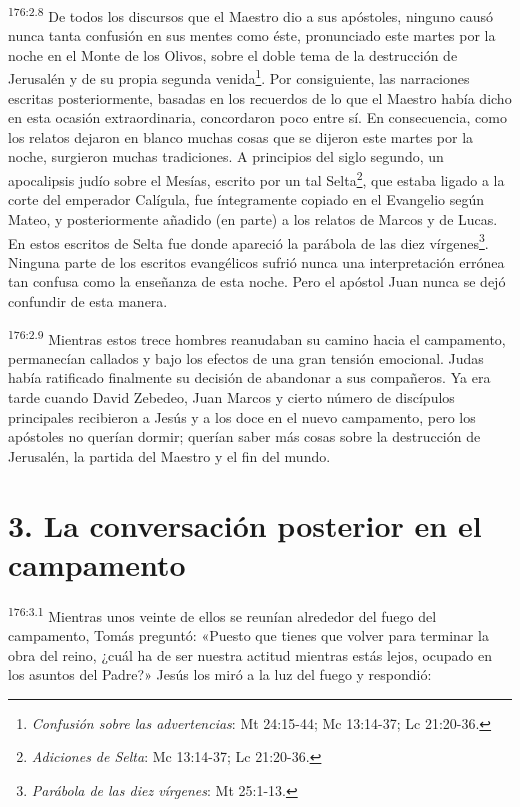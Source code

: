 \par 
\textsuperscript{176:2.8} De todos los discursos que el Maestro dio a sus apóstoles, ninguno causó nunca tanta confusión en sus mentes como éste, pronunciado este martes por la noche en el Monte de los Olivos, sobre el doble tema de la destrucción de Jerusalén y de su propia segunda venida\footnote{\textit{Confusión sobre las advertencias}: Mt 24:15-44; Mc 13:14-37; Lc 21:20-36.}. Por consiguiente, las narraciones escritas posteriormente, basadas en los recuerdos de lo que el Maestro había dicho en esta ocasión extraordinaria, concordaron poco entre sí. En consecuencia, como los relatos dejaron en blanco muchas cosas que se dijeron este martes por la noche, surgieron muchas tradiciones. A principios del siglo segundo, un apocalipsis judío sobre el Mesías, escrito por un tal Selta\footnote{\textit{Adiciones de Selta}: Mc 13:14-37; Lc 21:20-36.}, que estaba ligado a la corte del emperador Calígula, fue íntegramente copiado en el Evangelio según Mateo, y posteriormente añadido (en parte) a los relatos de Marcos y de Lucas. En estos escritos de Selta fue donde apareció la parábola de las diez vírgenes\footnote{\textit{Parábola de las diez vírgenes}: Mt 25:1-13.}. Ninguna parte de los escritos evangélicos sufrió nunca una interpretación errónea tan confusa como la enseñanza de esta noche. Pero el apóstol Juan nunca se dejó confundir de esta manera.

\par 
\textsuperscript{176:2.9} Mientras estos trece hombres reanudaban su camino hacia el campamento, permanecían callados y bajo los efectos de una gran tensión emocional. Judas había ratificado finalmente su decisión de abandonar a sus compañeros. Ya era tarde cuando David Zebedeo, Juan Marcos y cierto número de discípulos principales recibieron a Jesús y a los doce en el nuevo campamento, pero los apóstoles no querían dormir; querían saber más cosas sobre la destrucción de Jerusalén, la partida del Maestro y el fin del mundo.

\section*{3. La conversación posterior en el campamento}
\par 
\textsuperscript{176:3.1} Mientras unos veinte de ellos se reunían alrededor del fuego del campamento, Tomás preguntó: «Puesto que tienes que volver para terminar la obra del reino, ¿cuál ha de ser nuestra actitud mientras estás lejos, ocupado en los asuntos del Padre?» Jesús los miró a la luz del fuego y respondió:

